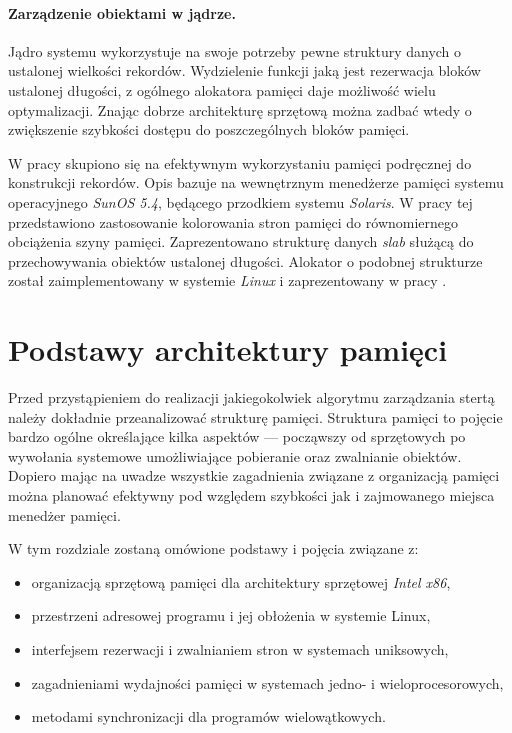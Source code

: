 \documentclass[12pt,a4paper,titlepage,twoside]{mwart}
\begin{document}
\paragraph{Zarządzenie obiektami w jądrze.}

Jądro systemu wykorzystuje na swoje potrzeby pewne struktury danych o ustalonej
wielkości rekordów. Wydzielenie funkcji jaką jest rezerwacja bloków
ustalonej długości, z ogólnego alokatora pamięci daje możliwość wielu
optymalizacji. Znając dobrze architekturę sprzętową można zadbać wtedy o
zwiększenie szybkości dostępu do poszczególnych bloków pamięci.

W pracy \cite{bonwick94slab} skupiono się na efektywnym wykorzystaniu pamięci
podręcznej do konstrukcji rekordów. Opis bazuje na wewnętrznym menedżerze
pamięci systemu operacyjnego \textit{SunOS 5.4}, będącego przodkiem systemu
\textit{Solaris}. W pracy tej przedstawiono zastosowanie kolorowania stron
pamięci do równomiernego obciążenia szyny pamięci. Zaprezentowano strukturę
danych \textit{slab} służącą do przechowywania obiektów ustalonej długości.
Alokator o podobnej strukturze został zaimplementowany w systemie
\textit{Linux} i zaprezentowany w pracy \cite{fitzgibbons00linux}.

\newpage


\section{Podstawy architektury pamięci}
\hypertarget{Architektura}{}

Przed przystąpieniem do realizacji jakiegokolwiek algorytmu zarządzania stertą
należy dokładnie przeanalizować strukturę pamięci. Struktura pamięci to pojęcie
bardzo ogólne określające kilka aspektów --- począwszy od sprzętowych po
wywołania systemowe umożliwiające pobieranie oraz zwalnianie obiektów. Dopiero
mając na uwadze wszystkie zagadnienia związane z organizacją pamięci można
planować efektywny pod względem szybkości jak i zajmowanego miejsca menedżer
pamięci.

W tym rozdziale zostaną omówione podstawy i pojęcia związane z:
\begin{itemize}
\item organizacją sprzętową pamięci dla architektury sprzętowej \textit{Intel x86},
\item przestrzeni adresowej programu i jej obłożenia w systemie Linux,
\item interfejsem rezerwacji i zwalnianiem stron w systemach uniksowych,
\item zagadnieniami wydajności pamięci w systemach jedno- i wieloprocesorowych,
\item metodami synchronizacji dla programów wielowątkowych.
\end{itemize}
\end{document}

